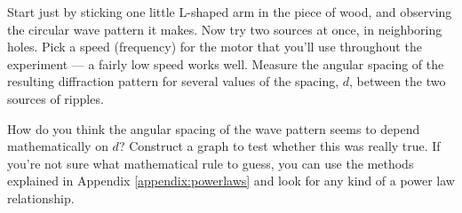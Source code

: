 Start just by sticking one little L-shaped arm in the piece
of wood, and observing the circular wave pattern it makes.
Now try two sources at once, in neighboring holes. Pick a
speed (frequency) for the motor that you'll use throughout
the experiment --- a fairly low speed works well. Measure
the angular spacing of the resulting diffraction pattern for
several values of the spacing, $d$, between the two sources of ripples.

How do you think the angular spacing of the wave pattern
seems to depend mathematically on $d$?
Construct a graph to test whether this was really true.
If you're not sure what mathematical rule to guess,
you can use  the methods explained in Appendix \ref{appendix:powerlaws}
and look for any kind of a power law relationship.
